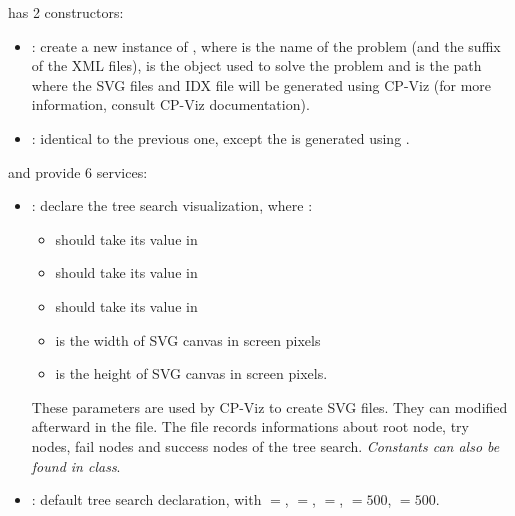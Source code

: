 \medskip
{} has 2 constructors:
\begin{itemize}
\item {}: create a new instance of , where  is the name of the problem (and the suffix of the XML files),  is the  object used to solve the problem and  is the path where the SVG files and IDX file will be generated using CP-Viz (for more information, consult CP-Viz documentation).
\item {}: identical to the previous one, except the  is generated using .
\end{itemize}
and provide 6 services:
\begin{itemize}

\item {}: declare the tree search visualization, where :
	\begin{itemize}
	\item {} should take its value in 
	\item {} should take its value in 
	\item {} should take its value in 
	\item {} is the width of SVG canvas in screen pixels
	\item {} is the height of SVG canvas in screen pixels. 
	\end{itemize}
These parameters are used by CP-Viz to create SVG files. They can modified afterward in the  file. The file records informations about root node, try nodes, fail nodes and success nodes of the tree search. 
\textit{Constants can also be found in  class}.

\item {}: default tree search declaration, with $=$, $=$, $=$, $=500$, $=500$.


\end{itemize}
